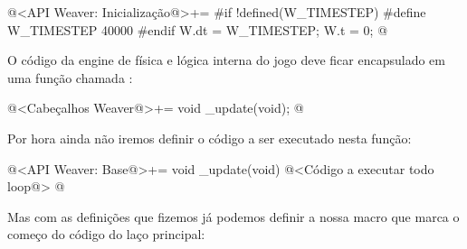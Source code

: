 \iniciocodigo
@<API Weaver: Inicialização@>+=
#if !defined(W_TIMESTEP)
#define W_TIMESTEP 40000
#endif
W.dt = W_TIMESTEP;
W.t = 0;
@
\fimcodigo

O código da engine de física e lógica interna do jogo deve ficar
encapsulado em uma função chamada :

\iniciocodigo
@<Cabeçalhos Weaver@>+=
void _update(void);
@
\fimcodigo

Por hora ainda não iremos definir o código a ser executado nesta
função:

\iniciocodigo
@<API Weaver: Base@>+=
void _update(void){
  @<Código a executar todo loop@>
}
@
\fimcodigo

Mas com as definições que fizemos já podemos definir a nossa macro que
marca o começo do código do laço principal:

